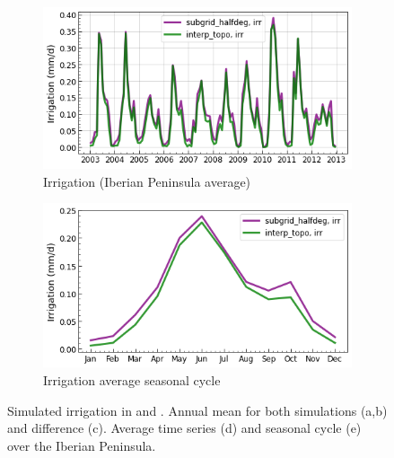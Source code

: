 \begin{figure}[htbp]
    \begin{subfigure}[b]{0.48\textwidth}
        \caption{Irrigation (Iberian Peninsula average)}
        \includegraphics[width=\linewidth]{images/chap3/time_series/irrigation_time_series.png}
    \end{subfigure}    
    \begin{subfigure}[b]{0.48\textwidth}
        \caption{Irrigation average seasonal cycle}
        \includegraphics[width=\linewidth]{images/chap3/time_series/irrigation_seasonal_cycle.png}
    \end{subfigure}

    \caption{Simulated irrigation in \std and \native. Annual mean for both simulations (a,b) and difference (c). Average time series (d) and seasonal cycle (e) over the Iberian Peninsula.}
    \label{fig:irrigation_halfdeg_eval}
\end{figure}

